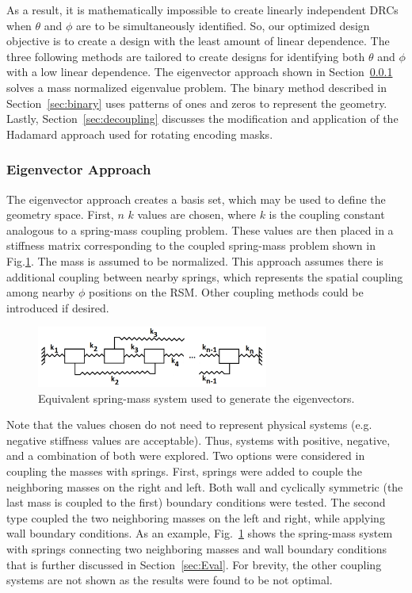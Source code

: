\documentclass[3p,times]{elsarticle}
\begin{document}
As a result, it is mathematically impossible to create linearly independent DRCs when $\theta$ and $\phi$ are to be simultaneously identified.  
So, our optimized design objective is to create a design with the least amount of linear dependence.  
The three following methods are tailored to create designs for identifying both $\theta$ and $\phi$ with a low linear dependence.  
The eigenvector approach shown in Section~\ref{sec:eigen} solves a mass normalized eigenvalue problem.  
The binary method described in Section~\ref{sec:binary} uses patterns of ones and zeros to represent the geometry.
Lastly, Section~\ref{sec:decoupling} discusses the modification and application of the Hadamard approach used for rotating encoding masks.

\subsubsection{Eigenvector Approach} \label{sec:eigen}
The eigenvector approach creates a basis set, which may be used to define the geometry space.  
First, $n$ $k$ values are chosen, where $k$ is the coupling constant analogous to a spring-mass coupling problem.  
These values are then placed in a stiffness matrix corresponding to the coupled spring-mass problem shown in Fig.\ref{fig:stiff}.  
The mass is assumed to be normalized.  
This approach assumes there is additional coupling between nearby springs, which represents the spatial coupling among nearby $\phi$ positions on the RSM.
Other coupling methods could be introduced if desired.

\begin{figure}[ht!]
\includegraphics[width={3.0in}]{../figs/MassSys.pdf}
\centering
\caption{Equivalent spring-mass system used to generate the eigenvectors.}
\label{fig:stiff}
\end{figure}

Note that the values chosen do not need to represent physical systems (e.g. negative stiffness values are acceptable).  Thus, systems with positive, negative, and a combination of both were explored.  Two options were considered in coupling the masses with springs.  First, springs were added to couple the neighboring masses on the right and left.  
Both wall and cyclically symmetric (the last mass is coupled to the first) boundary conditions were tested.  The second type coupled the two neighboring masses on the left and right, while
applying wall boundary conditions.
As an example, Fig.~\ref{fig:stiff} shows the spring-mass system with springs connecting two neighboring masses and wall boundary conditions
that is further discussed in Section~\ref{sec:Eval}.  For brevity, the other coupling systems are not shown as the results were found to be not optimal.
\end{document}
